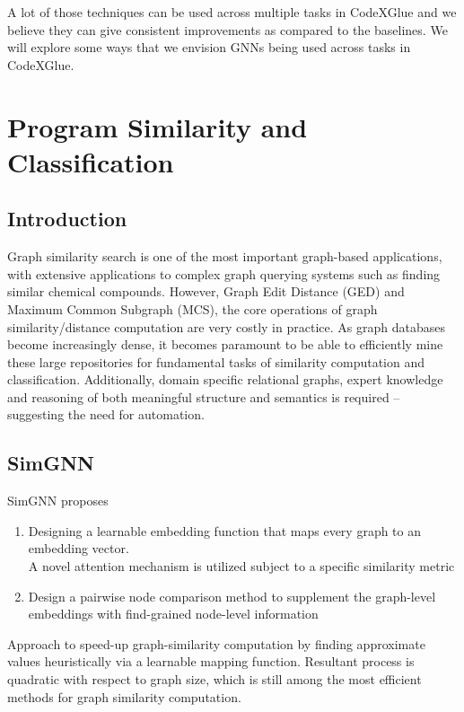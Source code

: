 \documentclass{article}
\begin{document}
A lot of those techniques can be used across multiple tasks in CodeXGlue and we believe they can give consistent improvements as compared to the baselines. We will explore some ways that we envision GNNs being used across tasks in CodeXGlue.

\section{Program Similarity and Classification}
\label{similarity}
\subsection{Introduction}

Graph similarity search is one of the most important graph-based applications, with extensive applications to complex graph querying systems such as finding similar chemical compounds.
However, Graph Edit Distance (GED) and Maximum Common Subgraph (MCS), the core operations of graph similarity/distance computation are very costly in practice.
As graph databases become increasingly dense, it becomes paramount to be able to efficiently mine these large repositories for fundamental tasks of similarity computation and classification.
Additionally, domain specific relational graphs, expert knowledge and reasoning of both meaningful structure and semantics is required – suggesting the need for automation.

\subsection{SimGNN}
SimGNN \cite{bai2019simgnn} proposes
\begin{enumerate}
    \item Designing a learnable embedding function that maps every graph to an embedding vector.\\
        A novel attention mechanism is utilized subject to a specific similarity metric
    \item Design a pairwise node comparison method to supplement the graph-level embeddings with find-grained node-level information
\end{enumerate}
Approach to speed-up graph-similarity computation by finding approximate values heuristically via a learnable mapping function. Resultant process is quadratic with respect to graph size, which is still among the most efficient methods for graph similarity computation.\\
\end{document}
